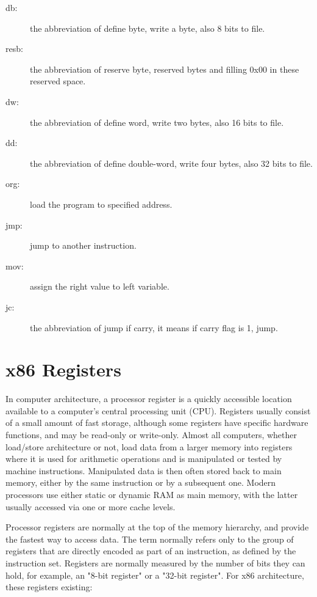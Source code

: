 \documentclass{swfcthesis}
\begin{document}
\begin{description}
\item[db:] the abbreviation of define byte, write a byte, also 8 bits to file.
\item[resb:] the abbreviation of reserve byte, reserved bytes and filling 0x00 in these reserved space.
\item[dw:] the abbreviation of define word, write two bytes, also 16 bits to file.
\item[dd:] the abbreviation of define double-word, write four bytes, also 32 bits to file.
\item[org:] load the program to specified address.
\item[jmp:] jump to another instruction.
\item[mov:] assign the right value to left variable.
\item[jc:] the abbreviation of jump if carry, it means if carry flag is 1, jump.
\end{description}

\section{x86 Registers}
\label{sec:register}

In computer architecture, a processor register is a quickly accessible location available
to a computer's central processing unit (CPU). Registers usually consist of a small amount
of fast storage, although some registers have specific hardware functions, and may be
read-only or write-only.  Almost all computers, whether load/store architecture or not,
load data from a larger memory into registers where it is used for arithmetic operations
and is manipulated or tested by machine instructions. Manipulated data is then often
stored back to main memory, either by the same instruction or by a subsequent one. Modern
processors use either static or dynamic RAM as main memory, with the latter usually
accessed via one or more cache levels.

\par Processor registers are normally at the top of the memory hierarchy, and provide the
fastest way to access data. The term normally refers only to the group of registers that
are directly encoded as part of an instruction, as defined by the instruction
set. Registers are normally measured by the number of bits they can hold, for example, an
"8-bit register" or a "32-bit register". For x86 architecture, these registers existing:
\end{document}
